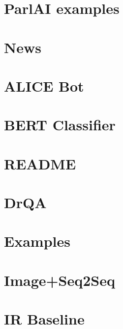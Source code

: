 \documentclass[twoside]{book}
\newcommand{\+}{\discretionary{\mbox{\scriptsize$\hookleftarrow$}}{}{}}
\begin{document}
\chapter{Parl\+AI examples}
\label{md_examples_README}

\chapter{News}
\label{md_NEWS}

\chapter{A\+L\+I\+CE Bot}
\label{md_parlai_agents_alice_README}

\chapter{B\+E\+RT Classifier}
\label{md_parlai_agents_bert_classifier_README}

\chapter{R\+E\+A\+D\+ME}
\label{md_parlai_agents_bert_ranker_README}

\chapter{Dr\+QA}
\label{md_parlai_agents_drqa_README}

\chapter{Examples}
\label{md_parlai_agents_examples_README}

\chapter{Image+\+Seq2\+Seq}
\label{md_parlai_agents_image_seq2seq_README}

\chapter{IR Baseline}
\label{md_parlai_agents_ir_baseline_README}

\end{document}
